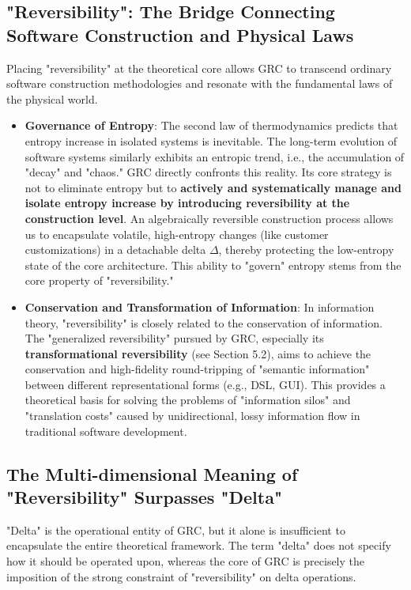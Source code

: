 \documentclass[11pt]{article}
\begin{document}
\subsection{"Reversibility": The Bridge Connecting Software Construction and Physical Laws}

Placing "reversibility" at the theoretical core allows GRC to transcend ordinary software construction methodologies and resonate with the fundamental laws of the physical world.

\begin{itemize}
    \item   \textbf{Governance of Entropy}: The second law of thermodynamics predicts that entropy increase in isolated systems is inevitable. The long-term evolution of software systems similarly exhibits an entropic trend, i.e., the accumulation of "decay" and "chaos." GRC directly confronts this reality. Its core strategy is not to eliminate entropy but to \textbf{actively and systematically manage and isolate entropy increase by introducing reversibility at the construction level}. An algebraically reversible construction process allows us to encapsulate volatile, high-entropy changes (like customer customizations) in a detachable delta $\Delta$, thereby protecting the low-entropy state of the core architecture. This ability to "govern" entropy stems from the core property of "reversibility."

    \item   \textbf{Conservation and Transformation of Information}: In information theory, "reversibility" is closely related to the conservation of information. The "generalized reversibility" pursued by GRC, especially its \textbf{transformational reversibility} (see Section 5.2), aims to achieve the conservation and high-fidelity round-tripping of "semantic information" between different representational forms (e.g., DSL, GUI). This provides a theoretical basis for solving the problems of "information silos" and "translation costs" caused by unidirectional, lossy information flow in traditional software development.
\end{itemize}

\subsection{The Multi-dimensional Meaning of "Reversibility" Surpasses "Delta"}

"Delta" is the operational entity of GRC, but it alone is insufficient to encapsulate the entire theoretical framework. The term "delta" does not specify how it should be operated upon, whereas the core of GRC is precisely the imposition of the strong constraint of "reversibility" on delta operations.
\end{document}
